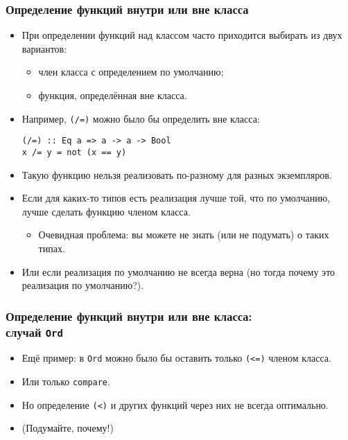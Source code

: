 \documentclass[10pt]{beamer}
\begin{document}
\begin{frame}[fragile]
\frametitle{Определение функций внутри или вне класса}
\begin{itemize}
    \item При определении функций над классом часто приходится выбирать из двух вариантов: 
    \begin{itemize}
        \item член класса с определением по умолчанию;
        \item функция, определённая вне класса.
    \end{itemize}
    \item Например, \lstinline|(/=)| можно было бы определить вне класса:
\begin{lstlisting}
(/=) :: Eq a => a -> a -> Bool
x /= y = not (x == y)
\end{lstlisting}\pause
    \item Такую функцию нельзя реализовать по-разному для разных экземпляров.\pause
    \item Если для каких-то типов есть реализация лучше той, что по умолчанию, лучше сделать функцию членом класса.
    \pause
    \begin{itemize}
        \item Очевидная проблема: вы можете не знать (или не подумать) о таких типах.
    \end{itemize}
    \pause
    \item Или если реализация по умолчанию не всегда верна \pause(но тогда почему это реализация по умолчанию?).
\end{itemize}
\end{frame}

\begin{frame}[fragile]
\frametitle{Определение функций внутри или вне класса:\\случай \lstinline|Ord|}
\begin{itemize}
    \item Ещё пример: в \lstinline|Ord| можно было бы оставить только \lstinline|(<=)| членом класса.
    \item Или только \lstinline|compare|.
    \item Но определение \lstinline|(<)| и других функций через них не всегда оптимально.
    \item (Подумайте, почему!)
\end{itemize}
\end{frame}
\end{document}

